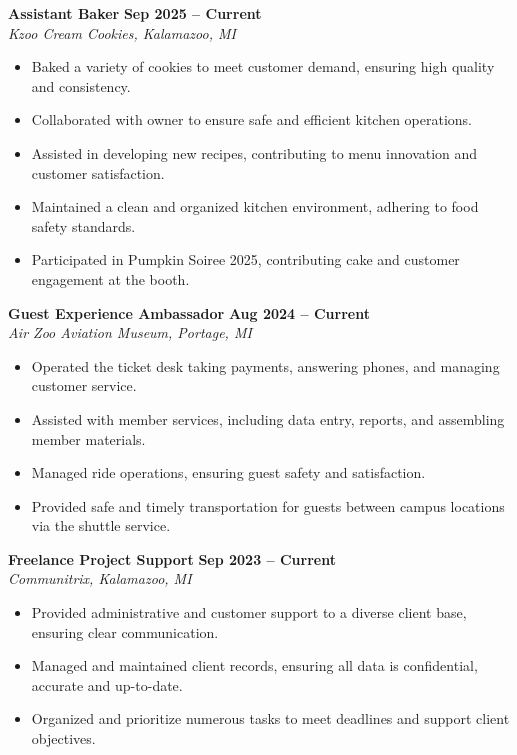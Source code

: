 \documentclass[a4paper,10pt]{article}
\begin{document}
\textbf{Assistant Baker} \hfill \textbf{Sep 2025 -- Current} \\
\textit{Kzoo Cream Cookies, Kalamazoo, MI}
\begin{itemize}[leftmargin=*, nosep]
    \item Baked a variety of cookies to meet customer demand, ensuring high quality and consistency.
    \item Collaborated with owner to ensure safe and efficient kitchen operations.
    \item Assisted in developing new recipes, contributing to menu innovation and customer satisfaction.
    \item Maintained a clean and organized kitchen environment, adhering to food safety standards.
    \item Participated in Pumpkin Soiree 2025, contributing cake and customer engagement at the booth.
\end{itemize}
\vspace{0.5em}
\textbf{Guest Experience Ambassador} \hfill \textbf{Aug 2024 -- Current} \\
\textit{Air Zoo Aviation Museum, Portage, MI}
\begin{itemize}[leftmargin=*, nosep]
    \item Operated the ticket desk taking payments, answering phones, and managing customer service.
    \item Assisted with member services, including data entry, reports, and assembling member materials.
    \item Managed ride operations, ensuring guest safety and satisfaction.
    \item Provided safe and timely transportation for guests between campus locations via the shuttle service.
\end{itemize}
\vspace{0.5em}
\textbf{Freelance Project Support} \hfill \textbf{Sep 2023 -- Current} \\
\textit{Communitrix, Kalamazoo, MI}
\begin{itemize}[leftmargin=*, nosep]
    \item Provided administrative and customer support to a diverse client base, ensuring clear communication.
    \item Managed and maintained client records, ensuring all data is confidential, accurate and up-to-date.
    \item Organized and prioritize numerous tasks to meet deadlines and support client objectives.
\end{itemize}
\end{document}
